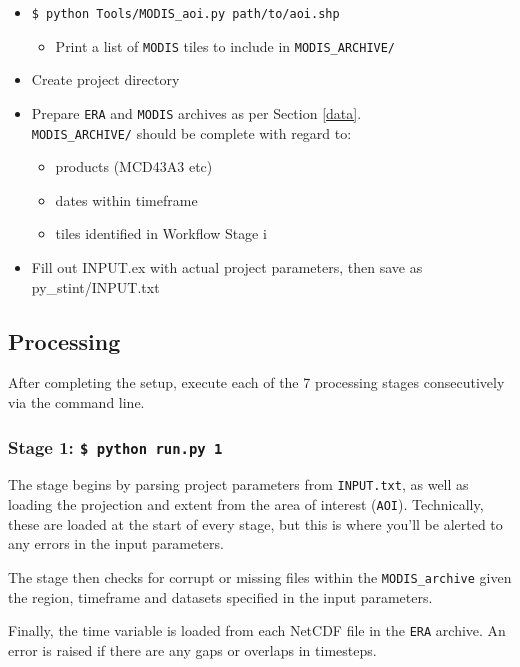 \documentclass[twoside,a4paper]{refart}
\begin{document}
\begin{itemize}
    \item
        \texttt{\$ python Tools/MODIS\_aoi.py path/to/aoi.shp}
        \begin{itemize}
            \item
                Print a list of \texttt{MODIS} tiles to include in \texttt{MODIS\_ARCHIVE/}
        \end{itemize}
    
    \item
        Create project directory
    \item
        Prepare \texttt{ERA} and \texttt{MODIS} archives 
        as per Section \ref{data}.  \\
        \texttt{MODIS\_ARCHIVE/} should be complete
        with regard to:
        \begin{itemize}
        \item
            products (MCD43A3 etc)
        \item
            dates within timeframe
        \item
            tiles identified in Workflow Stage i
        \end{itemize}
    \item
        Fill out INPUT.ex with actual project parameters, 
        then save as py\_stint/INPUT.txt
\end{itemize}


\subsection{Processing}
After completing the setup, execute each of the 7 processing stages consecutively via the command line.

\subsubsection{\textbf{Stage 1:} \texttt{\$ python run.py 1}}
The stage begins by parsing project parameters from \texttt{INPUT.txt}, as well as loading the projection and extent from the area of interest (\texttt{AOI}). Technically, these are loaded at the start of every stage, but this is where you'll be alerted to any errors in the input parameters.

The stage then checks for corrupt or missing files within the \texttt{MODIS\_archive} given the region, timeframe and datasets specified in the input parameters.

Finally, the time variable is loaded from each NetCDF file in the \texttt{ERA} archive.  An error is raised if there are any gaps or overlaps in timesteps.
\end{document}
